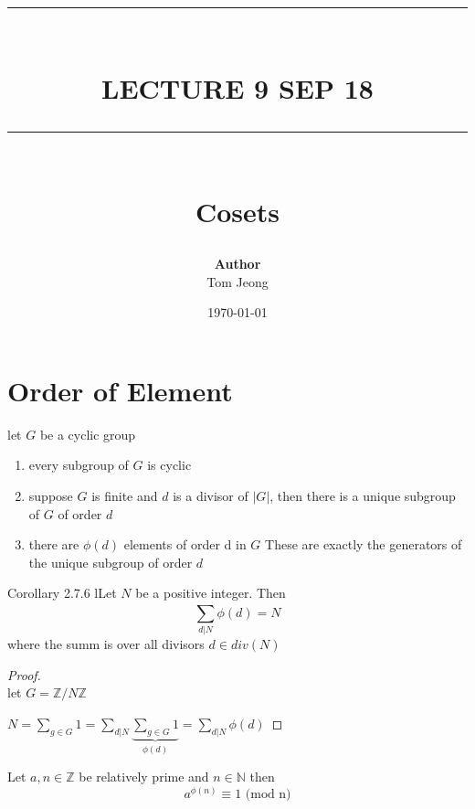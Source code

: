 \documentclass{article}
\newcommand{\HRule}[1]{\rule{\linewidth}{#1}}
\begin{document}

\title{ \normalsize \textsc{}
		\\ [2.0cm]
		\HRule{1.5pt} \\
		\LARGE \textbf{\uppercase{Lecture 9 sep 18}}
		\HRule{2.0pt} \\ [0.6cm] \LARGE{Cosets}
		}

\date{\today}
\author{\textbf{Author} \\ 
		Tom Jeong
        }

\maketitle
\newpage

\tableofcontents
\newpage

\section{Order of Element}
\begin{proposition}
    let $G$ be a cyclic group 
    \begin{enumerate}
        \item every subgroup of $G$ is cyclic
        \item suppose $G$ is finite and $d$ is a divisor of $|G|$, then there is a unique subgroup of $G$ of order $d$
        \item there are $\phi(d)$ elements of order d in $G$ These are exactly the generators of the unique subgroup of order $d$
        
    \end{enumerate}
\end{proposition}


Corollary 2.7.6 
lLet $N$ be a positive integer. Then $$\sum_{d|N}^{}\phi(d) = N$$ where the summ is over all divisors $d \in div(N)$
\begin{proof}
    \leavevmode\\
    let $G = \mathbb{Z} / N\mathbb{Z}$ 

    $N = \sum_{g \in G}^{} 1 = \sum_{d|N}^{} \underbrace{\sum_{g \in G}^{} 1}_{\phi(d)} = \sum_{d|N}^{}\phi(d) $
\end{proof}

\begin{theorem}[EUler 1.7.2]
    Let $a, n \in \mathbb{Z} $ be relatively prime and $n \in \mathbb{N}$ then $$a^{\phi(n) } \equiv 1 \text{ (mod n)}$$
    
\end{theorem}
\end{document}
